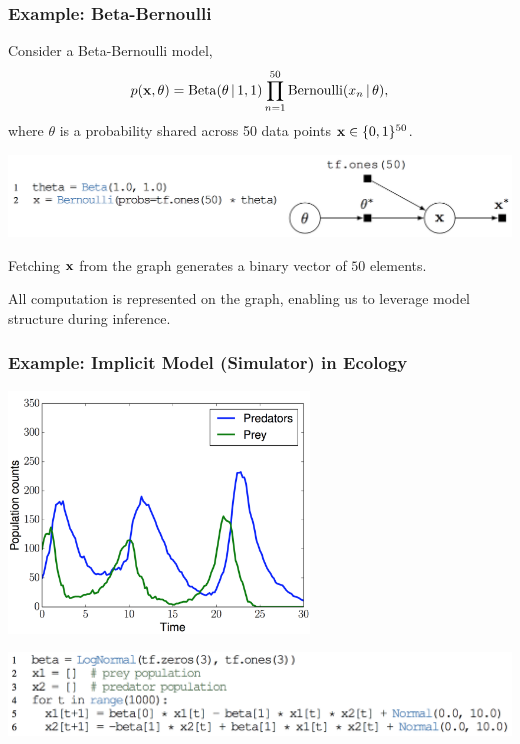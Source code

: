 \documentclass[10pt,
               xcolor={usenames,dvipsnames},
               hyperref={colorlinks,linktoc=all,citecolor=Plum,linkcolor=MidnightBlue,urlcolor=MidnightBlue},noamssymb]{beamer}
\begin{document}
\begin{frame}
\frametitle{Example: Beta-Bernoulli}
Consider a Beta-Bernoulli model,
\begin{align*}
p(\boldsymbol{\mathbf{x}}, \theta) =
\operatorname{Beta}(\theta\,|\, 1, 1)
\prod_{n=1}^{50} \operatorname{Bernoulli}(x_n\,|\, \theta),
\end{align*}
where $\theta$
is a probability shared across 50 data points $\boldsymbol{\mathbf{x}}\in\{0,1\}^{50}$.
\begin{center}
\vspace{-2ex}
\includegraphics[height=0.175\textwidth]{img/beta-bernoulli.png}
\end{center}
Fetching $\boldsymbol{\mathbf{x}}$ from the graph generates a binary vector of $50$ elements.

All computation is represented on the graph, enabling us to leverage model structure during inference.
\end{frame}

\begin{frame}[plain,t]
\frametitle{Example: Implicit Model (Simulator) in Ecology}
\begin{center}
\includegraphics[width=0.6\textwidth]{img/lotka_volterra_plot.png}
\end{center}

\begin{center}
\includegraphics[width=1.0\textwidth]{img/lotka_volterra_program.png}
\end{center}
\end{frame}
\end{document}
